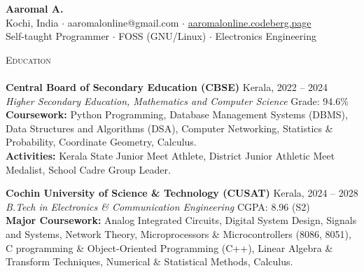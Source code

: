 \documentclass[a4paper]{article}
\newcommand{\lineunder} {
    \vspace*{-8pt} \\
    \hspace*{-18pt} \hrulefill \\
}
\newcommand{\header} [1] {
    {\hspace*{-18pt}\vspace*{6pt} \textsc{#1}}
    \vspace*{-6pt} \lineunder
}
\begin{document}
\vspace*{-40pt}

\vspace*{-10pt}
\begin{center}
    {\Huge \textbf{Aaromal A.}}\\
    \vspace{5pt}
    Kochi, India $\cdot$ aaromalonline@gmail.com $\cdot$ \href{https://aaromalonline.codeberg.page}{aaromalonline.codeberg.page} \\
    \vspace{4pt}
    Self-taught Programmer $\cdot$ FOSS (GNU/Linux) $\cdot$ Electronics Engineering
\end{center}
\vspace*{-8pt}

\vspace*{2mm}
\header{Education}
\textbf{Central Board of Secondary Education (CBSE)} \hfill Kerala, 2022 -- 2024\\
\textit{Higher Secondary Education, Mathematics and Computer Science} \hfill Grade: 94.6\%\\
\textbf{Coursework:} Python Programming, Database Management Systems (DBMS), Data Structures and Algorithms (DSA), Computer Networking, Statistics & Probability, Coordinate Geometry, Calculus.\\
\textbf{Activities:} Kerala State Junior Meet Athlete, District Junior Athletic Meet Medalist, School Cadre Group Leader.
\vspace{4mm}

\textbf{Cochin University of Science \& Technology (CUSAT)} \hfill Kerala, 2024 -- 2028\\
\textit{B.Tech in Electronics \& Communication Engineering} \hfill CGPA: 8.96 (S2)\\
\textbf{Major Coursework:} Analog Integrated Circuits, Digital System Design, Signals and Systems, Network Theory, Microprocessors \& Microcontrollers (8086, 8051), C programming \& Object-Oriented Programming (C++), Linear Algebra \& Transform Techniques, Numerical \& Statistical Methods, Calculus.
\vspace*{4mm}
\end{document}
